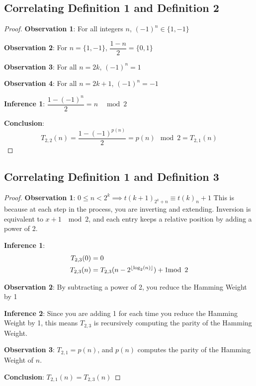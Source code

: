 \documentclass[conference]{IEEEtran}
\begin{document}
\subsection{Correlating Definition 1 and Definition 2}

\begin{proof}
\par\noindent\par
    \textbf{Observation 1}: For all integers $n$, $(-1)^n \in \{1, -1\}$

    \textbf{Observation 2}: For $n = \{1, -1\}$, $\dfrac{1 - n}{2} = \{0, 1\}$

    \textbf{Observation 3}: For all $n = 2k$, $(-1)^n = 1$

    \textbf{Observation 4}: For all $n = 2k + 1$, $(-1)^n = -1$

    \textbf{Inference 1}: $\dfrac{1 - (-1)^n}{2} = n \;\; \mod{2}$

    \textbf{Conclusion}: \begin{equation}
        T_{2,2}(n) = \dfrac{1 - (-1)^{p(n)}}{2} = p(n) \mod{2} = T_{2,1}(n)
    \end{equation}
\end{proof}

\subsection{Correlating Definition 1 and Definition 3}

\begin{proof}
\par\noindent\par
    \textbf{Observation 1}: $0 \le n < 2^k \implies t(k+1)_{2^k + n} \equiv t(k)_n + 1$
    This is because at each step in the process, you are inverting and extending. Inversion is equivalent to $x + 1 \; \mod{2}$, and each entry keeps a relative position by adding a power of 2.

    \textbf{Inference 1}: \begin{equation}
        \begin{aligned}
            T_{2,3}(0) &= 0 \\
            T_{2,3}(n) &= T_{2,3}(n - 2^{\floor{\log_2(n)}}) + 1 \mod{2}
        \end{aligned}
    \end{equation}

    \textbf{Observation 2}: By subtracting a power of 2, you reduce the Hamming Weight by 1

    \textbf{Inference 2}: Since you are adding 1 for each time you reduce the Hamming Weight by 1, this means $T_{2,3}$ is recursively computing the parity of the Hamming Weight.

    \textbf{Observation 3}: $T_{2,1} = p(n)$, and $p(n)$ computes the parity of the Hamming Weight of $n$.

    \textbf{Conclusion}: $T_{2,1}(n) = T_{2,3}(n)$
\end{proof}
\end{document}
